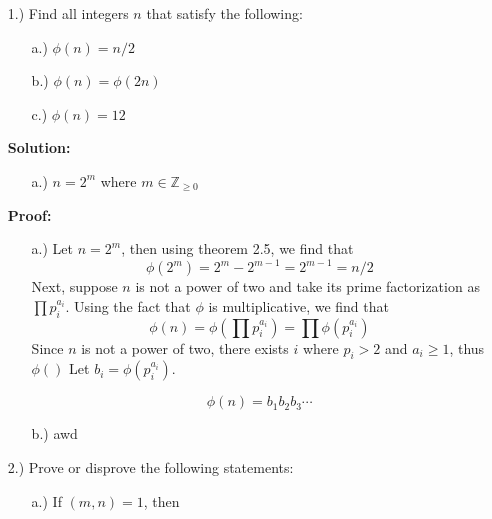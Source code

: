 \documentclass[12pt]{article}
\newcommand{\parens}[1]{\left( #1 \right)}
\newcommand{\Z}{\mathbb{Z}}
\newcommand{\solution}{\textbf{Solution:}}
\newcommand{\proof}{\textbf{Proof:}}
\begin{document}
    \pagestyle{fancy}

    \begin{itemize}
        \item[1.)] Find all integers \( n \) that satisfy the following:
        \begin{itemize}
            \item [a.)] \( \phi(n) = n / 2 \)
            \item [b.)] \( \phi(n) = \phi(2n) \)
            \item [c.)] \( \phi(n) = 12 \)
        \end{itemize}

        \solution

        \begin{itemize}
            \item [a.)] \( n = 2^m \) where \( m \in \Z_{\geq 0} \)
        \end{itemize}

        \proof

        \begin{itemize}
            \item [a.)] Let \( n = 2^m \), then using theorem 2.5, we find that
            \[
                \phi(2^m) = 2^m - 2^{m - 1} = 2^{m - 1} = n / 2
            \]
            Next, suppose \( n \) is not a power of two and take its prime
            factorization as \( \prod p_i^{a_i} \).
            Using the fact that \( \phi \) is multiplicative, we find that
            \[
                \phi(n)
                = \phi \parens{\prod p_i^{a_i}}
                = \prod \phi(p_i^{a_i})
            \]
            Since \( n \) is not a power of two, there exists \( i \) where
            \( p_i > 2 \) and \( a_i \geq 1 \), thus \( \phi()\)
            Let \( b_i = \phi(p_i^{a_i}) \).

            \[
                \phi(n)
                = b_1b_2b_3 \cdots
            \]

            \item [b.)] awd
        \end{itemize}

        \item [2.)] Prove or disprove the following statements:
        \begin{itemize}
            \item [a.)] If \( (m, n) = 1 \), then 
        \end{itemize}
    \end{itemize}
\end{document}
